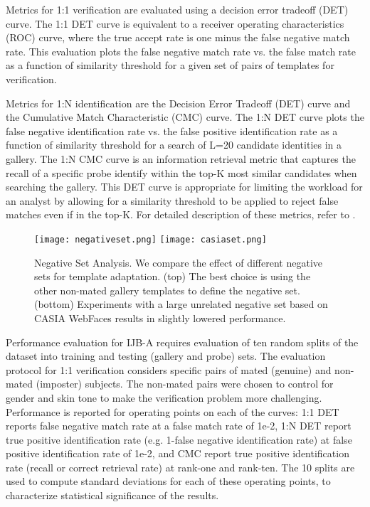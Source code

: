 \documentclass[10pt,twocolumn,letterpaper]{article}
\theoremstyle{definition}		\newtheorem{defn}[thm]{Definition}
\newcommand{\figwidth}{6.85in}
\newcommand{\ARXIV}{}
\begin{document}
Metrics for 1:1 verification are evaluated using a decision error tradeoff (DET) curve.  The 1:1 DET curve is equivalent to a receiver operating characteristics (ROC) curve, where the true accept rate is one minus the false negative match rate.   
This evaluation plots the false negative match rate vs. the false match rate as a function of similarity threshold for a given set of pairs of templates for verification.  


Metrics for 1:N identification are the Decision Error Tradeoff (DET) curve and the Cumulative Match Characteristic (CMC) curve.  The 1:N DET curve plots the false negative identification rate vs. the false positive identification rate as a function of similarity threshold for a search of L=20 candidate identities in a gallery.  The 1:N CMC curve is an information retrieval metric that captures the recall of a specific probe identify within the top-K most similar candidates when searching the gallery.  
This DET curve is appropriate for limiting the workload for an analyst by allowing for a similarity threshold to be applied to reject false matches even if in the top-K.  For detailed description of these metrics, refer to \cite{Klare15,Grother14}.


\ifdefined\ARXIV
\begin{figure*}[!t]
\begin{centering}
\texttt{[image: negativeset.png]} 
\texttt{[image: casiaset.png]} 
\caption{Negative Set Analysis.  We compare the effect of different negative sets for template adaptation.  (top) The best choice is using the other non-mated gallery templates to define the negative set.  (bottom) Experiments with a large unrelated negative set based on CASIA WebFaces results in slightly lowered performance.}
\label{f:negativeset}
\end{centering}
\end{figure*}
 \fi

Performance evaluation for IJB-A requires evaluation of ten random splits of the dataset into training and testing (gallery and probe) sets. The evaluation protocol for 1:1 verification considers specific pairs of mated (genuine) and non-mated (imposter) subjects.  The non-mated pairs were chosen to control for gender and skin tone to make the verification problem more challenging.  Performance is reported for operating points on each of the curves:  1:1 DET reports false negative match rate at a false match rate of 1e-2, 1:N DET report true positive identification rate (e.g. 1-false negative identification rate) at false positive identification rate of 1e-2, and CMC report true positive identification rate (recall or correct retrieval rate) at rank-one and rank-ten.  The 10 splits are used to compute standard deviations for each of these operating points, to characterize statistical significance of the results. 
\end{document}
